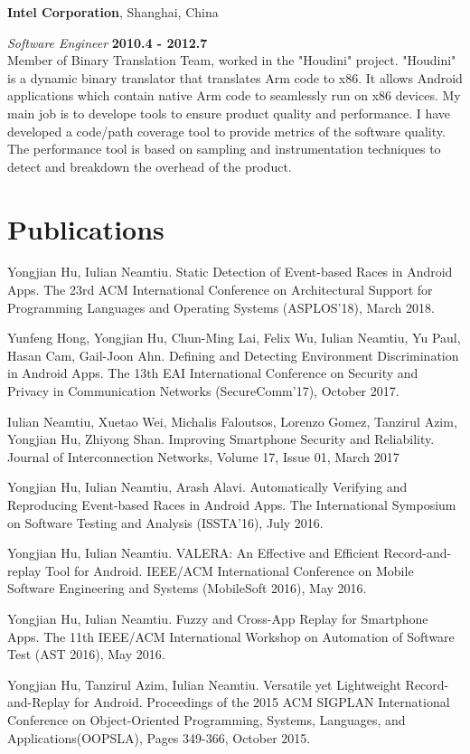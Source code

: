\documentclass[margin,line]{res}
\begin{document}
\begin{resume}
{\bf Intel Corporation}, Shanghai, China

\vspace{-.3cm}
{\em Software Engineer} \hfill {\bf 2010.4 - 2012.7}\\
Member of Binary Translation Team, worked in the "Houdini" project.
"Houdini" is a dynamic binary translator that translates Arm code to 
x86. It allows Android applications which contain native Arm code to 
seamlessly run on x86 devices. My main job is to develope tools to ensure 
product quality and performance. I have developed a code/path coverage 
tool to provide metrics of the software quality. The performance tool 
is based on sampling and instrumentation techniques to detect and 
breakdown the overhead of the product.


\section{\sc Publications}
Yongjian Hu, Iulian Neamtiu.
Static Detection of Event-based Races in Android Apps.
The 23rd ACM International Conference on Architectural Support for Programming Languages and Operating Systems (ASPLOS'18), March 2018.

Yunfeng Hong, Yongjian Hu, Chun-Ming Lai, Felix Wu, Iulian Neamtiu, Yu Paul, Hasan Cam, Gail-Joon Ahn.
Defining and Detecting Environment Discrimination in Android Apps.
The 13th EAI International Conference on Security and Privacy in Communication Networks (SecureComm'17), October 2017.

Iulian Neamtiu, Xuetao Wei, Michalis Faloutsos, Lorenzo Gomez, Tanzirul Azim, Yongjian Hu, Zhiyong Shan.
Improving Smartphone Security and Reliability.
Journal of Interconnection Networks, Volume 17, Issue 01, March 2017

Yongjian Hu, Iulian Neamtiu, Arash Alavi. Automatically Verifying and Reproducing Event-based Races in Android Apps.
The International Symposium on Software Testing and Analysis (ISSTA'16), July 2016.

Yongjian Hu, Iulian Neamtiu. VALERA: An Effective and Efficient Record-and-replay Tool for Android.
IEEE/ACM International Conference on Mobile Software Engineering and Systems (MobileSoft 2016), May 2016.

Yongjian Hu, Iulian Neamtiu. Fuzzy and Cross-App Replay for Smartphone Apps.
The 11th IEEE/ACM International Workshop on Automation of Software Test (AST 2016), May 2016.

Yongjian Hu, Tanzirul Azim, Iulian Neamtiu. Versatile yet Lightweight Record-and-Replay for Android.
Proceedings of the 2015 ACM SIGPLAN International Conference on Object-Oriented Programming, Systems, Languages, and Applications(OOPSLA),
Pages 349-366, October 2015.


\end{resume}
\end{document}
